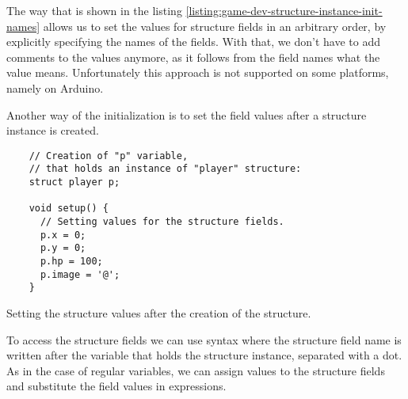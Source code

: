 \documentclass[../sparc.tex]{subfiles}
\begin{document}
The way that is shown in the listing
\ref{listing:game-dev-structure-instance-init-names} allows us to set the values
for structure fields in an arbitrary order, by explicitly specifying the names
of the fields.  With that, we don't have to add comments to the values anymore,
as it follows from the field names what the value means.  Unfortunately this
approach is not supported on some platforms, namely on Arduino.

Another way of the initialization is to set the field values after a structure
instance is created.

\begin{listing}[H]
  \begin{verbatim}
    // Creation of "p" variable,
    // that holds an instance of "player" structure:
    struct player p;

    void setup() {
      // Setting values for the structure fields.
      p.x = 0;
      p.y = 0;
      p.hp = 100;
      p.image = '@';
    }
  \end{verbatim}
  \caption{Setting the structure values after the creation of the structure.}
  \label{listing:game-dev-structure-assignment}
\end{listing}

To access the structure fields we can use syntax where the structure field name
is written after the variable that holds the structure instance, separated with
a dot.  As in the case of regular variables, we can assign values to the
structure fields and substitute the field values in expressions.
\end{document}
